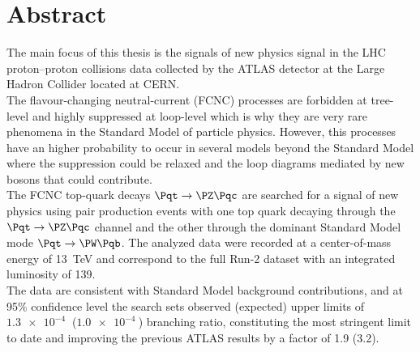 \chapter*{Abstract}        %

\vspace{-1cm}
\begin{adjustwidth}{1.5cm}{1.5cm}
	The main focus of this thesis is the signals of new physics signal in the
	LHC proton–proton collisions data collected by the ATLAS detector at 
	the Large Hadron Collider located at CERN.\\		
	The flavour-changing neutral-current (FCNC) processes are forbidden at tree-level and 
	highly suppressed at loop-level which is why they are very rare phenomena in the Standard Model of particle physics.
	However, this processes have an higher probability to occur in several models beyond the Standard Model where the 
	suppression could be relaxed and the loop diagrams mediated by new bosons that could contribute.\\	
	The FCNC top-quark decays $\mathrm{\Pqt\rightarrow\PZ\Pqc}$ are searched for a signal of new physics using 
	\ttbar pair production events with one top quark decaying through the $\mathrm{\Pqt\rightarrow\PZ\Pqc}$ channel 
	and the other through the dominant Standard Model mode $\mathrm{\Pqt\rightarrow\PW\Pqb}$.
	The analyzed data were recorded at a center-of-mass energy of \SI{13}{\TeV} and correspond to the full Run-2 dataset 
	with an integrated luminosity of \SI{139}{\ifb}.\\
	The data are consistent with Standard Model background contributions, and at 95\% confidence level the search sets observed (expected) upper limits of $\mathrm{\SI{1.3e-4}{}}$ ($\mathrm{\SI{1.0e-4}{}}$) branching ratio, constituting the most stringent limit to date and improving the previous ATLAS results by a factor of 1.9 (3.2).
	
	
\end{adjustwidth}




